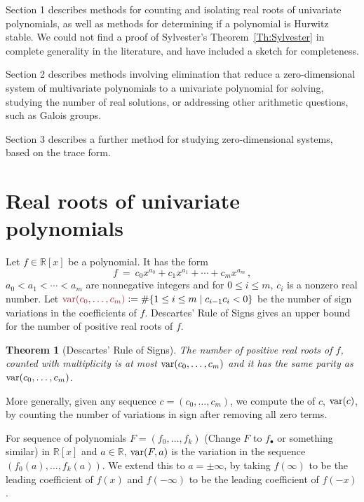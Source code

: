 \documentclass[12pt]{amsart}
\newtheorem{theorem}{Theorem}
\theoremstyle{definition}
\newcommand{\RR}{\mathbb{R}}
\DeclareMathOperator{\var}{{\rm var}}
\newcommand{\defcolor}[1]{{\color{Maroon}#1}}
\newcommand{\demph}[1]{\defcolor{{\sl #1}}}
\newcommand{\note}[1]{{\color{red}(#1)}}
\begin{document}
Section 1 describes methods for counting and isolating real roots of univariate polynomials, as well as methods for determining if a
polynomial is Hurwitz stable.
We could not find a proof of Sylvester's Theorem~\ref{Th:Sylvester} in complete generality in the literature, and have included a sketch for
completeness. 

Section 2 describes methods involving elimination that reduce a zero-dimensional system of multivariate polynomials to a univariate
polynomial for solving, studying the number of real solutions, or addressing other arithmetic questions, such as Galois groups.

Section 3 describes a further method for studying zero-dimensional systems, based on the trace form.


\section{Real roots of univariate polynomials}

Let $f\in\RR[x]$ be a polynomial.
It has the form
%
 \[
   f\ =\ c_{0}x^{a_{0}} + c_{1}x^{a_{1}} + \cdots + c_{m}x^{a_{m}}\,,
 \]
%
$a_{0} < a_{1} < \cdots < a_{m}$ are nonnegative integers and for $0\leq i \leq m$, $c_{i}$ is a nonzero real number.
Let $\defcolor{\var(c_0,\dotsc,c_m)}\vcentcolon=\#\{1\leq i\leq m\mid c_{i-1}c_i<0\}$ be the number of sign variations in the coefficients
of $f$.
Descartes' Rule of Signs \cite{So_Book} gives an upper bound for the number of positive real roots of $f$.

\begin{theorem}[Descartes' Rule of Signs]
  The number of positive real roots of $f$, counted with multiplicity is at most $\var(c_0,\dotsc,c_m)$ and it has the same parity
  as $\var(c_0,\dotsc,c_m)$.
\end{theorem}

More generally, given any sequence $c=(c_0,\dotsc,c_m)$, we compute the \demph{variation} of $c$, $\var(c)$, by counting the number of
variations in sign after removing all zero terms.
%
\begin{leftbar}

\end{leftbar}
%
For sequence of polynomials  $F=(f_0,\dotsc,f_k)$ \note{Change $F$ to $f_\bullet$ or something similar} in $\RR[x]$ and $a\in\RR$, \defcolor{$\var(F,a)$} is the variation in the sequence
$(f_0(a),\dotsc,f_{k}(a))$. 
We extend this to $a=\pm\infty$, by taking $f(\infty)$ to be the leading coefficient of $f(x)$ and $f(-\infty)$ to be the leading
coefficient of $f(-x)$.
\end{document}
